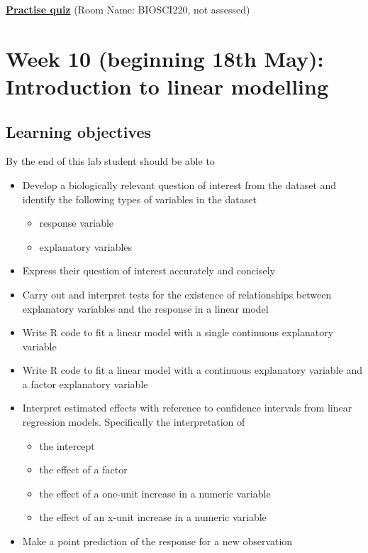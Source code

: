 \documentclass{article}
\begin{document}
\begin{center}
  \href{https://b.socrative.com/login/student/}{\textbf{\Large Practise quiz}} (Room Name: BIOSCI220, not assessed)
  
\end{center}




\newpage

\section*{Week 10 (beginning 18th May): Introduction to linear modelling}
\subsection*{Learning objectives}
By the end of this lab student should be able to
\begin{itemize}
\item Develop a biologically relevant question of interest  from the dataset and identify the following types of variables in the dataset
  \begin{itemize}
  \item response variable
  \item explanatory variables
  \end{itemize}
\item Express their question of interest accurately and concisely
\item Carry out and interpret tests for the existence of relationships between explanatory variables and the response in a linear model
\item Write R code to fit a linear model with a single continuous explanatory variable
\item Write R code to fit a linear model with a continuous explanatory variable and a factor explanatory variable
\item Interpret estimated effects with reference to confidence intervals from linear regression models. Specifically the interpretation of
  \begin{itemize}
  \item the intercept
  \item the effect of a factor
  \item the effect of a one-unit increase in a numeric variable
  \item the effect of an x-unit increase in a numeric variable
  \end{itemize}
\item Make a point prediction of the response for a new observation
\end{itemize}
\end{document}
